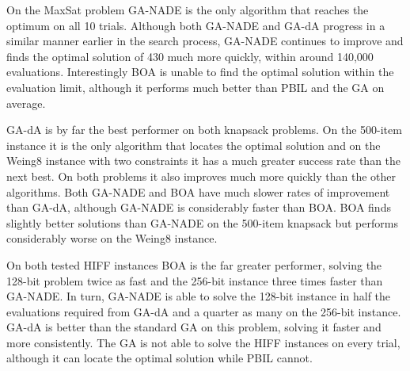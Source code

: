 \documentclass[twoside]{article}
\begin{document}
On the MaxSat problem GA-NADE is the only algorithm that reaches the optimum on all 10 trials. Although both GA-NADE and GA-dA progress in a similar manner earlier in the search process, GA-NADE continues to improve and finds the optimal solution of 430 much more quickly, within around 140,000 evaluations. Interestingly BOA is unable to find the optimal solution within the evaluation limit, although it performs much better than PBIL and the GA on average.

GA-dA is by far the best performer on both knapsack problems. On the 500-item instance it is the only algorithm that locates the optimal solution and on the Weing8 instance with two constraints it has a much greater success rate than the next best. On both problems it also improves much more quickly than the other algorithms. Both GA-NADE and BOA have much slower rates of improvement than GA-dA, although GA-NADE is considerably faster than BOA. BOA finds slightly better solutions than GA-NADE on the 500-item knapsack but performs considerably worse on the Weing8 instance.

On both tested HIFF instances BOA is the far greater performer, solving the 128-bit problem twice as fast and the 256-bit instance three times faster than GA-NADE. In turn, GA-NADE is able to solve the 128-bit instance in half the evaluations required from GA-dA and a quarter as many on the 256-bit instance. GA-dA is better than the standard GA on this problem, solving it faster and more consistently. The GA is not able to solve the HIFF instances on every trial, although it can locate the optimal solution while PBIL cannot.
\end{document}

